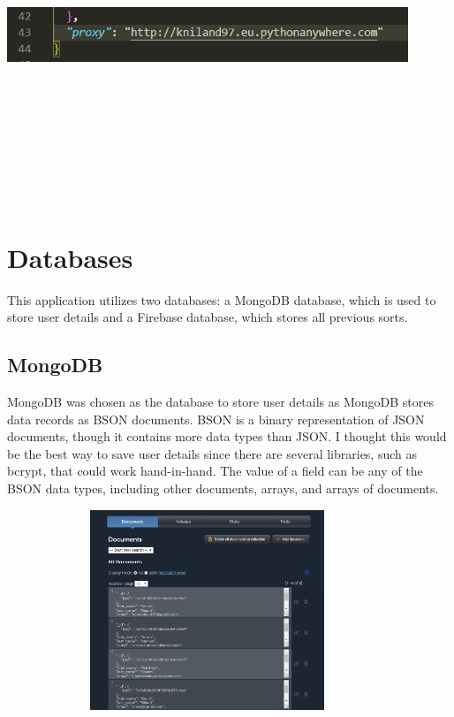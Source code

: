 \begin{center}
    \includegraphics[width=12cm,height=10cm,keepaspectratio]{images/proxy}
\end{center}

\section{Databases}
This application utilizes two databases: a MongoDB database, which is used to store user details and a Firebase database, which stores all previous sorts.

\subsection{MongoDB}
MongoDB was chosen as the database to store user details as MongoDB stores data records as BSON documents. BSON is a binary representation of JSON documents, though it contains more data types than JSON. I thought this would be the best way to save user details since there are several libraries, such as bcrypt, that could work hand-in-hand. The value of a field can be any of the BSON data types, including other documents, arrays, and arrays of documents. 

\begin{center}
    \includegraphics[width=12cm,height=6cm,keepaspectratio]{images/mlab}
\end{center}

